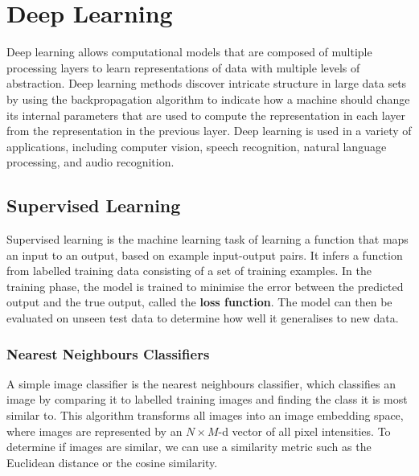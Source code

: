 \documentclass{article}
\begin{document}
\section{Deep Learning}
Deep learning allows computational models that are composed of multiple
processing layers to learn representations of data with multiple levels
of abstraction. Deep learning methods discover intricate structure in
large data sets by using the backpropagation algorithm to indicate how
a machine should change its internal parameters that are used to
compute the representation in each layer from the representation in the
previous layer. Deep learning is used in a variety of applications,
including computer vision, speech recognition, natural language
processing, and audio recognition.
\subsection{Supervised Learning}
Supervised learning is the machine learning task of learning a function
that maps an input to an output, based on example input-output pairs.
It infers a function from labelled training data consisting of a set of
training examples. In the training phase, the model is trained to
minimise the error between the predicted output and the true output,
called the \textbf{loss function}. The model can then be evaluated on
unseen test data to determine how well it generalises to new data.
\subsubsection{Nearest Neighbours Classifiers}
A simple image classifier is the nearest neighbours classifier, which
classifies an image by comparing it to labelled training images and
finding the class it is most similar to. This algorithm transforms all
images into an image embedding space, where images are represented by
an \(N \times M\)-d vector of all pixel intensities. To determine if
images are similar, we can use a similarity metric such as the
Euclidean distance or the cosine similarity.
\end{document}
